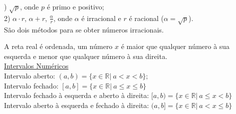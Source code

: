 ) $ \sqrt{p}$, onde $p$ é primo e positivo;\\
2) $\alpha \cdot r$, $ \alpha + r$, $ \frac{\alpha}{r}$, onde $\alpha$ é irracional e $r$ é racional ($ \alpha = \sqrt{p} $).\\

São dois métodos para se obter números irracionais.
\vspace{18pt}


A reta real é ordenada, um número $x$ é maior que qualquer número à sua esquerda e menor que qualquer número à sua direita. \\

\noindent
\underline{Intervalos Numéricos}\\

\noindent
\textbullet \; Intervalo aberto: $( a, b) = \{ x \in \mathbb{R} | \ a < x < b \};$ \\
\textbullet \; Intervalo fechado: $ [a, b] = \{ x \in \mathbb{R} | \ a \leq x \leq b  \} $ \\
\textbullet \; Intervalo fechado à esquerda e aberto à direita: $ [a, b) = \{ x \in \mathbb{R} |  \ a \leq x < b \} $ \\
\textbullet \; Intervalo aberto à esquerda e fechado à direita:  $ (a, b] = \{ x \in \mathbb{R} | \ a < x \leq b \} $